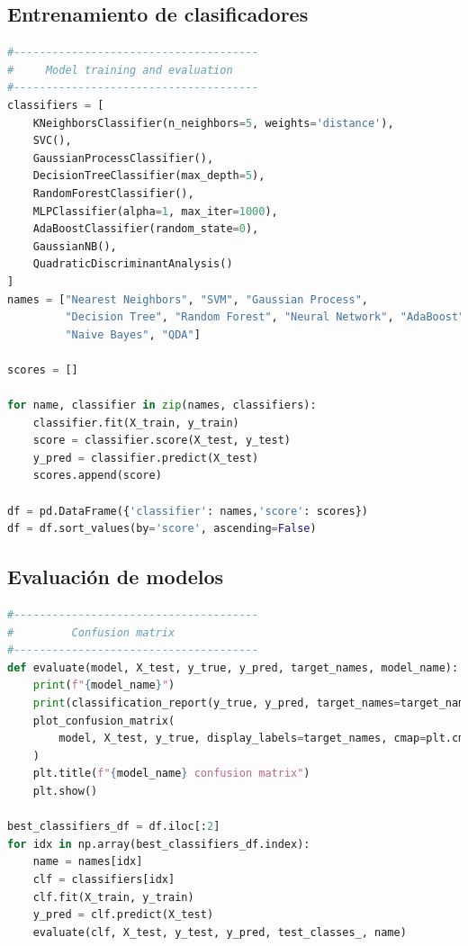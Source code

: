 \documentclass[conference]{IEEEtran}
\begin{document}
\subsection{Entrenamiento de clasificadores}

\begin{lstlisting}[language=python]
#--------------------------------------
#     Model training and evaluation
#--------------------------------------
classifiers = [
    KNeighborsClassifier(n_neighbors=5, weights='distance'),
    SVC(),
    GaussianProcessClassifier(),
    DecisionTreeClassifier(max_depth=5),
    RandomForestClassifier(),
    MLPClassifier(alpha=1, max_iter=1000),
    AdaBoostClassifier(random_state=0),
    GaussianNB(),
    QuadraticDiscriminantAnalysis()
]
names = ["Nearest Neighbors", "SVM", "Gaussian Process",
         "Decision Tree", "Random Forest", "Neural Network", "AdaBoost",
         "Naive Bayes", "QDA"]

scores = []

for name, classifier in zip(names, classifiers):
    classifier.fit(X_train, y_train)
    score = classifier.score(X_test, y_test)
    y_pred = classifier.predict(X_test)
    scores.append(score)

df = pd.DataFrame({'classifier': names,'score': scores})
df = df.sort_values(by='score', ascending=False)\end{lstlisting}

\subsection{Evaluación de modelos}
\begin{lstlisting}[language=python]
#--------------------------------------
#         Confusion matrix
#--------------------------------------
def evaluate(model, X_test, y_true, y_pred, target_names, model_name):
    print(f"{model_name}")
    print(classification_report(y_true, y_pred, target_names=target_names))
    plot_confusion_matrix(
        model, X_test, y_true, display_labels=target_names, cmap=plt.cm.Blues
    )
    plt.title(f"{model_name} confusion matrix")
    plt.show()
    
best_classifiers_df = df.iloc[:2]
for idx in np.array(best_classifiers_df.index):
    name = names[idx]
    clf = classifiers[idx]
    clf.fit(X_train, y_train)
    y_pred = clf.predict(X_test)
    evaluate(clf, X_test, y_test, y_pred, test_classes_, name)\end{lstlisting}




\begin{thebibliography}{}
\bibitem{}

\end{thebibliography}
\end{document}
